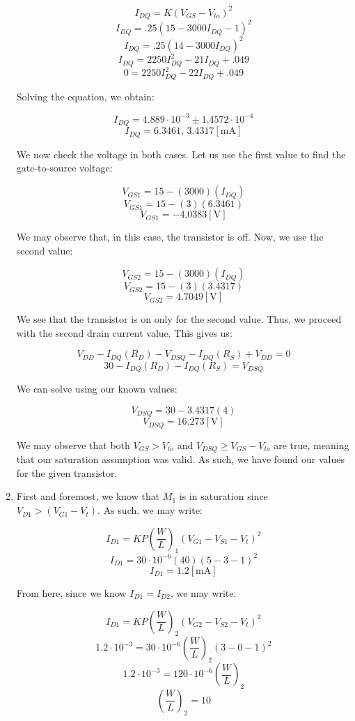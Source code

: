 \begin{enumerate}
    $$I_{DQ}=K(V_{GS}-V_{to})^2$$
    $$I_{DQ}=.25(15-3000I_{DQ}-1)^2$$
    $$I_{DQ}=.25(14-3000I_{DQ})^2$$
    $$I_{DQ}=2250I_{DQ}^2-21I_{DQ}+.049$$
    $$0=2250I_{DQ}^2-22I_{DQ}+.049$$

    Solving the equation, we obtain:

    $$I_{DQ}=4.889\cdot10^{-3}\pm1.4572\cdot10^{-4}$$
    $$\boxed{I_{DQ}=6.3461,\,3.4317[\si{\milli\ampere}]}$$

    We now check the voltage in both cases. Let us use the first value to find the gate-to-source voltage:

    $$V_{GS1}=15-(3000)(I_{DQ})$$
    $$V_{GS1}=15-(3)(6.3461)$$
    $$\boxed{V_{GS1}=-4.0383[\si{\volt}]}$$

    We may observe that, in this case, the transistor is off. Now, we use the second value:

    $$V_{GS2}=15-(3000)(I_{DQ})$$
    $$V_{GS2}=15-(3)(3.4317)$$
    $$\boxed{V_{GS2}=4.7049[\si{\volt}]}$$

    We see that the transistor is on only for the second value. Thus, we proceed with the second drain current value. This gives us:

    $$V_{DD}-I_{DQ}(R_D)-V_{DSQ}-I_{DQ}(R_S)+V_{DD}=0$$
    $$30-I_{DQ}(R_D)-I_{DQ}(R_S)=V_{DSQ}$$

    We can solve using our known values:

    $$V_{DSQ}=30-3.4317(4)$$
    $$\boxed{V_{DSQ}=16.273[\si{\volt}]}$$

    We may observe that both $V_{GS}>V_{to}$ and $V_{DSQ}\geq V_{GS}-V_{to}$ are true, meaning that our saturation assumption was valid. As such, we have found our values for the given transistor.

  \item First and foremost, we know that $M_1$ is in saturation since $V_{D1}>(V_{G1}-V_t)$. As such, we may write:

    $$I_{D1}=KP\left( \frac{W}{L} \right)_1\left( V_{G1}-V_{S1}-V_t \right)^2$$
    $$I_{D1}=30\cdot10^{-6}\left( 40 \right)\left( 5-3-1 \right)^2$$
    $$\boxed{I_{D1}=1.2[\si{\milli\ampere}]}$$

    From here, since we know $I_{D1}=I_{D2}$, we may write:

    $$I_{D1}=KP\left( \frac{W}{L} \right)_2(V_{G2}-V_{S2}-V_t)^2$$
    $$1.2\cdot10^{-3}=30\cdot10^{-6}\left( \frac{W}{L} \right)_2(3-0-1)^2$$
    $$1.2\cdot10^{-3}=120\cdot10^{-6}\left( \frac{W}{L} \right)_2$$
    $$\boxed{\left( \frac{W}{L} \right)_2=10}$$

\end{enumerate}



